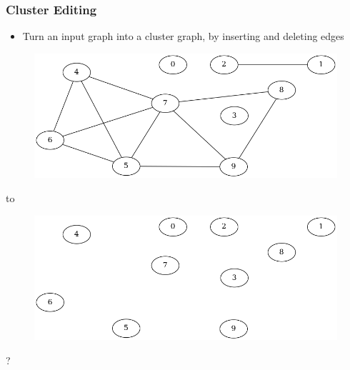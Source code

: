 \documentclass{beamer}
\begin{document}
\begin{frame}
	\frametitle{Cluster Editing}

	\begin{itemize}
		\item Turn an input graph into a cluster graph, by inserting and deleting edges
	\end{itemize}

	\pause

	\begin{figure}[h]
		\centering
		\includegraphics[width=0.5\linewidth]{exact001-input}
	\end{figure}

	\pause

	\centering
	to

	\begin{figure}[h]
		\centering
		\includegraphics[width=0.5\linewidth]{exact001-no-edges}
	\end{figure}

	\centering
	?
\end{frame}
\end{document}
